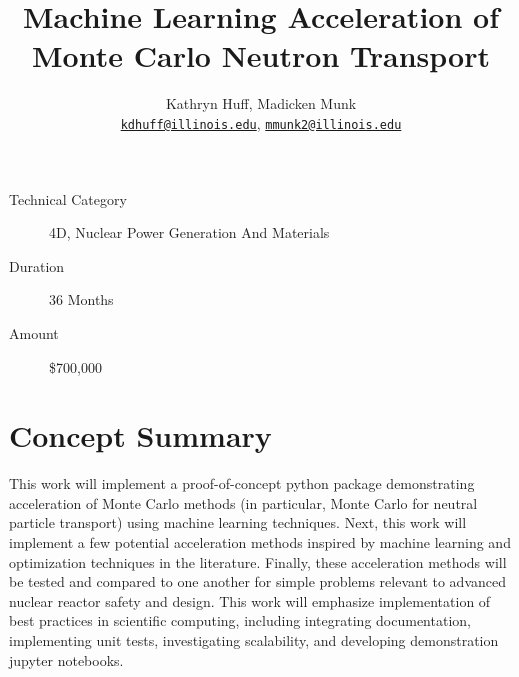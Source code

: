 \documentclass[letterpaper,12pt]{article}
\author{Kathryn Huff, Madicken Munk\\
        \href{mailto:kdhuff@illinois.edu}{\texttt{kdhuff@illinois.edu}},
        \href{mailto:mmunk2@illinois.edu}{\texttt{mmunk2@illinois.edu}}
}
\date{}
\title{Machine Learning Acceleration of Monte Carlo Neutron Transport}
\begin{document}
\maketitle

\thispagestyle{fancy}
\begin{center}
\begin{description}
    \item[Technical Category] 4D, Nuclear Power Generation And Materials
    \item[Duration] 36 Months
    \item[Amount] \$700,000
\end{description}
\end{center}

\section{Concept Summary}


This work will implement a proof-of-concept python package demonstrating
acceleration of Monte Carlo methods (in particular, Monte Carlo for neutral
particle transport) using machine learning techniques.
Next, this work will implement a few potential acceleration methods inspired by machine
learning and optimization techniques in the literature.
Finally, these acceleration methods will be tested and compared to one another for simple
problems relevant to advanced nuclear reactor safety and design.
This work will emphasize implementation of best practices in
scientific computing, including integrating documentation, implementing unit
tests, investigating scalability, and developing demonstration jupyter
notebooks.
\end{document}
